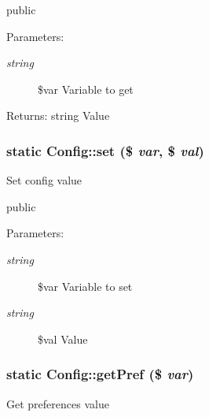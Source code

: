 public \begin{Desc}
\item[Parameters:]
\begin{description}
\item[{\em string}]\$var Variable to get \end{description}
\end{Desc}
\begin{Desc}
\item[Returns:]string Value \end{Desc}
\hypertarget{classConfig_efc9b653ba1b3353dd782cdf0ecb4983}{
\subsubsection[set]{\setlength{\rightskip}{0pt plus 5cm}static Config::set (\$ {\em var}, \/  \$ {\em val})}}
\label{classConfig_efc9b653ba1b3353dd782cdf0ecb4983}


Set config value

public \begin{Desc}
\item[Parameters:]
\begin{description}
\item[{\em string}]\$var Variable to set \item[{\em string}]\$val Value \end{description}
\end{Desc}
\hypertarget{classConfig_232f5008f38ed5f98853244095b935af}{
\subsubsection[getPref]{\setlength{\rightskip}{0pt plus 5cm}static Config::getPref (\$ {\em var})}}
\label{classConfig_232f5008f38ed5f98853244095b935af}


Get preferences value

